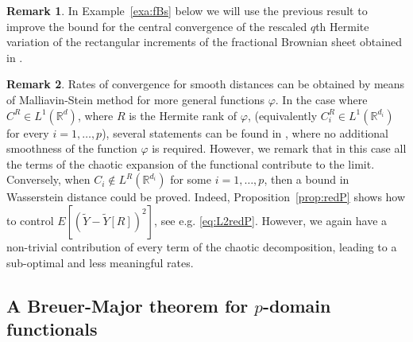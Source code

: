 \documentclass[12pt]{article}
\DeclareMathOperator{\1}{1}
\newcommand{\R}{\mathbb{R}}
\theoremstyle{plain}
\theoremstyle{definition}
\newtheorem{remark}{Remark}
\begin{document}
\begin{remark}\label{rem:discrete}
    In Example~\ref{exa:fBs} below we will use the previous result to improve the bound for the central convergence of the rescaled $q$th Hermite variation of the rectangular increments of the fractional Brownian sheet obtained in \cite{RST}.
\end{remark}


{\begin{remark}
   Rates of convergence for smooth distances can be obtained by means of Malliavin-Stein method for more general functions $\varphi$. In the case where $C^R \in L^1(\mathbb R^d)$, where $R$ is the Hermite rank of $\varphi$, (equivalently $C_i^R \in L^1(\mathbb R^{d_i})$ for every $i=1,\ldots,p$), several statements can be found in \cite{quantitative}, where no additional smoothness of the function $\varphi$ is required. However, we remark that in this case all the terms of the chaotic expansion of the functional contribute to the limit. Conversely, when $C_i \notin L^R(\R^{d_i})$ for some $i=1,\ldots,p$, then a bound in Wasserstein distance could be proved. Indeed, Proposition~\ref{prop:redP} shows how to control $E[(\widetilde Y - \widetilde Y[R])^2]$, see e.g. \eqref{eq:L2redP}. However, we again have a non-trivial contribution of every term of the chaotic decomposition, leading to a sub-optimal and less meaningful rates. 
\end{remark}}

\subsection{A Breuer-Major theorem for \texorpdfstring{$p$}{p}-domain functionals}\label{subsec:BMpdom}
\end{document}
